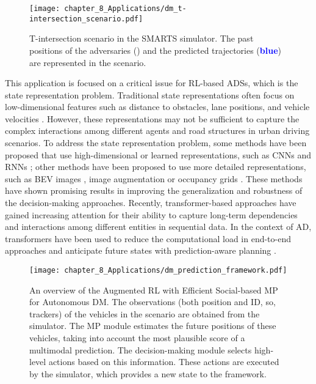 \begin{figure}[h]
	\centering
	\texttt{[image: chapter\_8\_Applications/dm\_t-intersection\_scenario.pdf]}
	\captionsetup{justification=justified}
	\caption[T-intersection scenario in the \ac{SMARTS} simulator]{T-intersection scenario in the \ac{SMARTS} simulator. The past positions of the adversaries (\textbf{\color{YellowOrange}{yellow}}) and the predicted trajectories (\textbf{\textcolor{blue}{blue}}) are represented in the scenario.}
	\label{fig:chapter_8_Applications/dm_t-intersection_scenario}
\end{figure}

This application is focused on a critical issue for \ac{RL}-based \acp{ADS}, which is the state representation problem. Traditional state representations often focus on low-dimensional features such as distance to obstacles, lane positions, and vehicle velocities \cite{Rodrigo2023}. However, these representations may not be sufficient to capture the complex interactions among different agents and road structures in urban driving scenarios. To address the state representation problem, some methods have been proposed that use high-dimensional or learned representations, such as \acp{CNN} \cite{Johan2018} and \acp{RNN} \cite{Tram2018}; other methods have been proposed to use more detailed representations, such as  \ac{BEV} images \cite{zhang2021endtoend}, image augmentation \cite{kostrikov2021image} or occupancy grids \cite{moghadam2019hierarchical}. These methods have shown promising results in improving the generalization and robustness of the decision-making approaches. Recently, transformer-based approaches have gained increasing attention for their ability to capture long-term dependencies and interactions among different entities in sequential data. In the context of \ac{AD}, transformers have been used to reduce the computational load in end-to-end approaches \cite{Li4} and anticipate future states with prediction-aware planning \cite{valiente2022predictionaware}.

\begin{figure}[h]
	\centering        
	\texttt{[image: chapter\_8\_Applications/dm\_prediction\_framework.pdf]}
	\captionsetup{justification=justified}
	\caption[An overview of the Augmented \ac{RL} with Efficient Social-based \ac{MP} for Autonomous \ac{DM}]{An overview of the Augmented \ac{RL} with Efficient Social-based \ac{MP} for Autonomous \ac{DM}. The observations (both position and ID, so, trackers) of the vehicles in the scenario are obtained from the simulator. The MP module estimates the future positions of these vehicles, taking into account the most plausible score of a multimodal prediction. The decision-making module selects high-level actions based on this information. These actions are executed by the simulator, which provides a new state to the framework.}
	\label{fig:chapter_8_Applications/dm_prediction_framework}
\end{figure}

